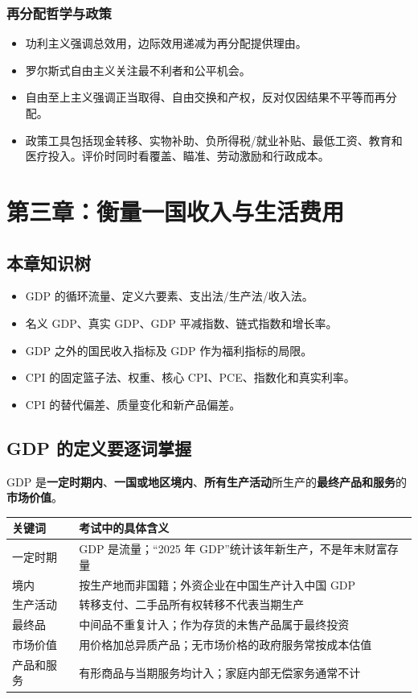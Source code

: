 \documentclass[UTF8,11pt,a4paper]{ctexart}
\newcommand{\term}[1]{\textbf{#1}}
\begin{document}
\subsubsection{再分配哲学与政策}
\begin{itemize}
  \item 功利主义强调总效用，边际效用递减为再分配提供理由。
  \item 罗尔斯式自由主义关注最不利者和公平机会。
  \item 自由至上主义强调正当取得、自由交换和产权，反对仅因结果不平等而再分配。
  \item 政策工具包括现金转移、实物补助、负所得税/就业补贴、最低工资、教育和医疗投入。评价时同时看覆盖、瞄准、劳动激励和行政成本。
\end{itemize}

\newpage
\section{第三章：衡量一国收入与生活费用}

\subsection{本章知识树}
\begin{itemize}
  \item GDP 的循环流量、定义六要素、支出法/生产法/收入法。
  \item 名义 GDP、真实 GDP、GDP 平减指数、链式指数和增长率。
  \item GDP 之外的国民收入指标及 GDP 作为福利指标的局限。
  \item CPI 的固定篮子法、权重、核心 CPI、PCE、指数化和真实利率。
  \item CPI 的替代偏差、质量变化和新产品偏差。
\end{itemize}

\subsection{GDP 的定义要逐词掌握}
\begin{keybox}[标准定义]
GDP 是\term{一定时期内}、\term{一国或地区境内}、\term{所有生产活动}所生产的\term{最终产品和服务}的\term{市场价值}。
\end{keybox}

\begin{longtable}{p{}p{}}
\toprule
关键词 & 考试中的具体含义\\
\midrule
一定时期 & GDP 是流量；“2025 年 GDP”统计该年新生产，不是年末财富存量\\
境内 & 按生产地而非国籍；外资企业在中国生产计入中国 GDP\\
生产活动 & 转移支付、二手品所有权转移不代表当期生产\\
最终品 & 中间品不重复计入；作为存货的未售产品属于最终投资\\
市场价值 & 用价格加总异质产品；无市场价格的政府服务常按成本估值\\
产品和服务 & 有形商品与当期服务均计入；家庭内部无偿家务通常不计\\
\bottomrule
\end{longtable}
\end{document}
